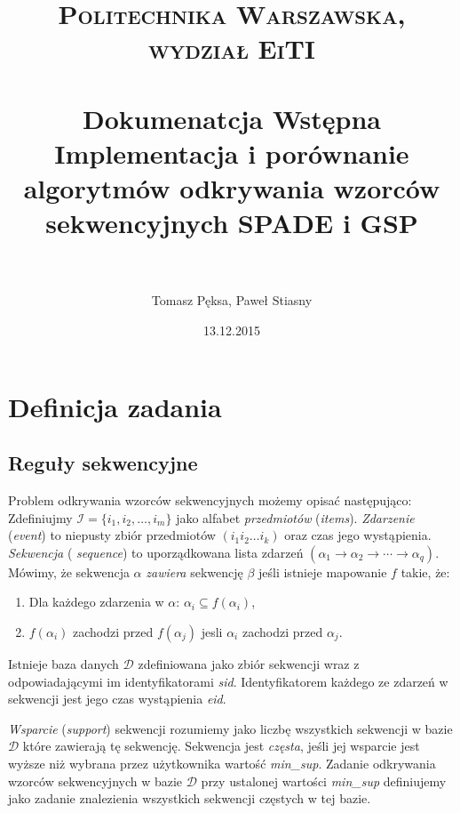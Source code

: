 \documentclass[paper=a4, fontsize=11pt]{scrartcl} %
\title{	
\normalfont \normalsize 
\textsc{Politechnika Warszawska, wydział EiTI} \\ [25pt] %
\horrule{0.5pt} \\[0.4cm] %
\huge Dokumenatcja Wstępna \\ %
\large Implementacja i porównanie algorytmów odkrywania wzorców sekwencyjnych SPADE i GSP \\
\horrule{2pt} \\[0.5cm] %
}
\author{Tomasz Pęksa, Paweł Stiasny} %
\date{\normalsize13.12.2015} %
\numberwithin{equation}{section} %
\numberwithin{figure}{section} %
\numberwithin{table}{section} %
\begin{document}
\maketitle %


\section{Definicja zadania}

\subsection{Reguły sekwencyjne}

Problem odkrywania wzorców sekwencyjnych możemy opisać następująco: Zdefiniujmy
\( \mathcal I = \{ i_1, i_2, \ldots, i_m \} \) jako alfabet {\em przedmiotów}
({\em items}).  {\em Zdarzenie} ({\em event}) to niepusty zbiór przedmiotów \(
( i_1i_2\ldots i_k ) \) oraz czas jego wystąpienia.  {\em Sekwencja} ({\em
sequence}) to uporządkowana lista zdarzeń \( ( \alpha_1 \rightarrow \alpha_2 \rightarrow \cdots \rightarrow \alpha_q ) \).
Mówimy, że sekwencja \( \alpha \) {\em zawiera} sekwencję \( \beta \) jeśli
istnieje mapowanie \( f \) takie, że:
\begin{enumerate}
    \item Dla każdego zdarzenia w \( \alpha \): \( \alpha_i \subseteq f(\alpha_i) \),
    \item \( f(\alpha_i) \) zachodzi przed \( f(\alpha_j) \) jesli \( \alpha_i \)
        zachodzi przed \( \alpha_j \).
\end{enumerate}

Istnieje baza danych \( \mathcal D \) zdefiniowana jako zbiór sekwencji wraz
z odpowiadającymi im identyfikatorami {\em sid}.  Identyfikatorem każdego ze
zdarzeń w sekwencji jest jego czas wystąpienia {\em eid}.

{\em Wsparcie} ({\em support}) sekwencji rozumiemy jako liczbę wszystkich
sekwencji w bazie \( \mathcal D \) które zawierają tę sekwencję.  Sekwencja
jest {\em częsta}, jeśli jej wsparcie jest wyższe niż wybrana przez użytkownika
wartość {\em min\_sup}.  Zadanie odkrywania wzorców sekwencyjnych w bazie \(
\mathcal D \) przy ustalonej wartości {\em min\_sup} definiujemy jako zadanie
znalezienia wszystkich sekwencji częstych w tej bazie.
\end{document}

